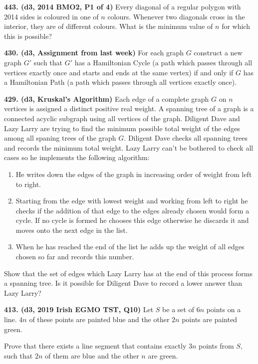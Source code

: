 \documentclass{article}
\begin{document}
        \textbf{443. (\color{red}d3\color{black}, 2014 BMO2, P1 of 4)} Every diagonal of a regular polygon with 2014 sides is coloured in one of $n$ colours. Whenever two diagonals cross in the interior, they are of different colours. What is the minimum value of $n$ for which this is possible?

        \textbf{430. (\color{red}d3\color{black}, Assignment from last week)} For each graph $G$ construct a new graph $G'$ such that $G'$ has a Hamiltonian Cycle (a path which passes through all vertices exactly once and starts and ends at the same vertex) if and only if $G$ has a Hamiltonian Path (a path which passes through all vertices exactly once).

        \textbf{429. (\color{red}d3\color{black}, Kruskal's Algorithm)} Each edge of a complete graph $G$ on $n$ vertices is assigned a distinct positive real weight. A spanning tree of a graph is a connected acyclic subgraph using all vertices of the graph. Diligent Dave and Lazy Larry are trying to find the minimum possible total weight of the edges among all spaning trees of the graph $G.$ Diligent Dave checks all spanning trees and records the minimum total weight. Lazy Larry can't be bothered to check all cases so he implements the following algorithm:
        \begin{enumerate}
                \item He writes down the edges of the graph in increasing order of weight from left to right.
                \item Starting from the edge with lowest weight and working from left to right he checks if the addition of that edge to the edges already chosen would form a cycle. If no cycle is formed he chooses this edge otherwise he discards it and moves onto the next edge in the list.
                \item When he has reached the end of the list he adds up the weight of all edges chosen so far and records this number.
        \end{enumerate}
        Show that the set of edges which Lazy Larry has at the end of this process forms a spanning tree.
        Is it possible for Diligent Dave to record a lower answer than Lazy Larry?

        \textbf{413. (\color{red}d3\color{black}, 2019 Irish EGMO TST, Q10)} Let \(S\) be a set of \(6 n\) points on a line. \(4 n\) of these points are painted blue and the other \(2 n\) points are painted
        green.

        Prove that there exists a line segment that contains exactly \(3 n\) points from \(S,\) such that \(2 n\) of them are blue and the other \(n\) are green.
\end{document}
